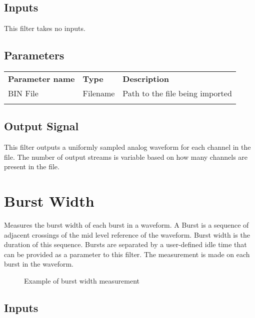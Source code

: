 \subsection{Inputs}

This filter takes no inputs.

\subsection{Parameters}

\begin{tabularx}{16cm}{llX}
\thickhline
\textbf{Parameter name} & \textbf{Type} & \textbf{Description} \\
\thickhline
BIN File & Filename & Path to the file being imported\\
\thickhline
\end{tabularx}

\subsection{Output Signal}

This filter outputs a uniformly sampled analog waveform for each channel in the file. The number of output streams is
variable based on how many channels are present in the file.

\pagebreak
\section{Burst Width}

Measures the burst width of each burst in a waveform. A Burst is a sequence of adjacent crossings of the mid level reference
of the waveform. Burst width is the duration of this sequence. Bursts are separated by a user-defined idle time that can be
provided as a parameter to this filter. The measurement is made on each burst in the waveform.

\begin{figure}[h]
	\centering
	\caption{Example of burst width measurement}
	\label{filter_burstwidth}
	\end{figure}

\subsection{Inputs}

